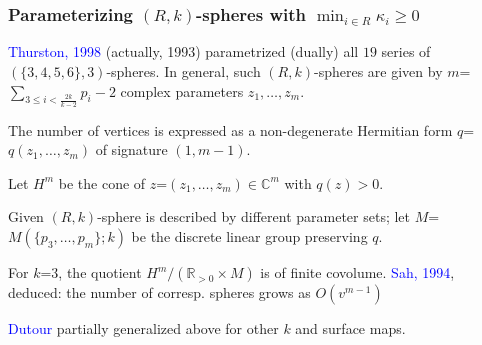 \documentclass{beamer}
\begin{document}
\begin{frame}\frametitle{Parameterizing $(R,k)$-spheres with $\min_{i\in 
R}\kappa_i\ge 0$}

\textcolor{blue}{Thurston, 1998} (actually, 1993)
  parametrized 
  (dually)
all
$19$ series of $(\{3,4,5,6\},3)$-spheres.
In general, such $(R,k)$-spheres are given by 
$m$=$\sum_{3\le i<\frac{2k}{k-2}}p_i-2$ complex parameters $z_1,\dots,z_m$.

The number of vertices
is expressed as a non-degenerate Hermitian form $q$=$q(z_1,\dots,z_m)$ of  
 signature $(1,m-1)$. 

Let $H^m$ be the cone of $z$=$(z_1,\dots,z_m)\in \mathbb{C}^m$ with $q(z)>0$.

Given $(R,k)$-sphere is  described by different parameter sets; let 
$M$=$M(\{p_3,\dots,p_m\};k)$ be  the discrete linear group preserving $q$.

For $k$=$3$,  the quotient 
$H^m/(\mathbb{R}_{>0}\times M)$ is of  finite covolume. 
\textcolor{blue}{Sah, 1994}, deduced:
 the number of
corresp. spheres grows as $O(v^{m-1})$

\textcolor{blue}{Dutour} partially generalized above for other $k$ and surface maps.
\end{frame}
\end{document}
